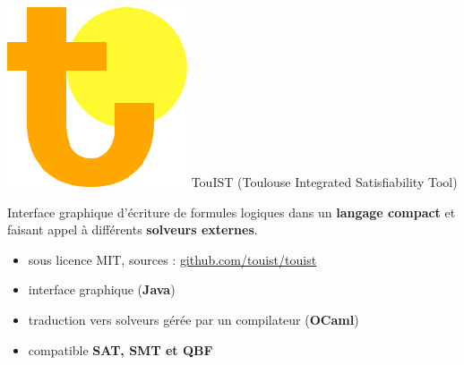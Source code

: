 \documentclass[english,french,usenames,dvipsnames]{beamer}
\begin{document}
\begin{frame}{\subsecname}
\includegraphics[scale=0.2]{figures/iaf2015/touist_logo.png}
\huge TouIST \normalsize (Toulouse Integrated Satisfiability Tool)\\[2ex]
\begin{center}
Interface graphique d'écriture de formules logiques dans un \textbf{langage compact} et faisant appel à différents \textbf{solveurs externes}.
\end{center}
\begin{itemize}
    \item sous licence MIT, sources : \url{github.com/touist/touist}
    \item interface graphique (\textbf{Java})
    \item traduction vers solveurs gérée par un compilateur (\textbf{OCaml})
    \item compatible \textbf{SAT, SMT et QBF}
\end{itemize}
\end{frame}


\end{document}
